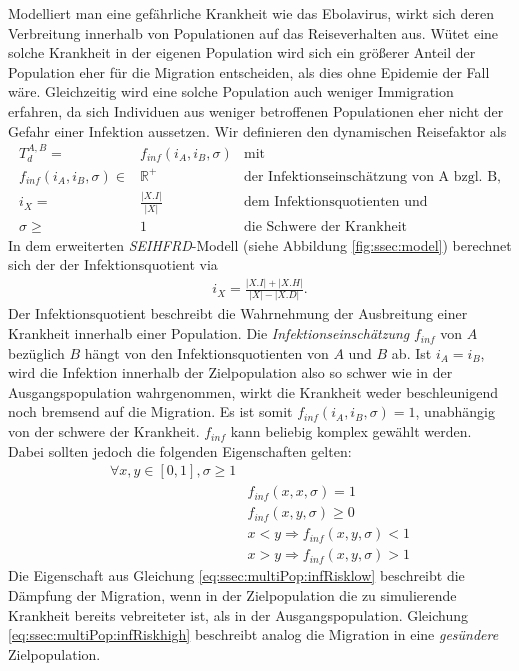 Modelliert man eine gefährliche Krankheit wie das Ebolavirus, wirkt sich deren Verbreitung innerhalb von Populationen auf das Reiseverhalten aus. Wütet eine solche Krankheit in der eigenen Population wird sich ein größerer Anteil der Population eher für die Migration entscheiden, als dies ohne Epidemie der Fall wäre. Gleichzeitig wird eine solche Population auch weniger Immigration erfahren, da sich Individuen aus weniger betroffenen Populationen eher nicht der Gefahr einer Infektion aussetzen. Wir definieren den dynamischen Reisefaktor als
\begin{align}
	T^{A,B}_d =& f_{inf}(i_A,i_B, \sigma)&\text{mit}\\
	f_{inf}(i_A,i_B,\sigma) \in& \mathbb{R}^+&\text{der Infektionseinschätzung von A bzgl. B,}\label{eq:ssec:multiPop:infRisk}\\
	i_X =& \frac{|X.I|}{|X|}&\text{dem Infektionsquotienten und}\\
	\sigma \geq&1 & \text{die Schwere der Krankheit}\label{eq:ssec:multiPop:severity}
\end{align}
In dem erweiterten \emph{SEIHFRD}-Modell (siehe Abbildung \ref{fig:ssec:model}) berechnet sich der der Infektionsquotient via 
\begin{align}
	i_X = \frac{|X.I|+|X.H|}{|X| - |X.D|}.
\end{align}
Der Infektionsquotient beschreibt die Wahrnehmung der Ausbreitung einer Krankheit innerhalb einer Population. Die \emph{Infektionseinschätzung} $f_{inf}$ von $A$ bezüglich $B$ hängt von den Infektionsquotienten von $A$ und $B$ ab. Ist $i_A = i_B$, wird die Infektion innerhalb der Zielpopulation also so schwer wie in der Ausgangspopulation wahrgenommen, wirkt die Krankheit weder beschleunigend noch bremsend auf die Migration. Es ist somit $f_{inf}(i_A,i_B,\sigma)=1$, unabhängig von der schwere der Krankheit. $f_{inf}$ kann beliebig komplex gewählt werden. Dabei sollten jedoch die folgenden Eigenschaften gelten:
\begin{align}
	\forall x, y \in [0,1], \sigma \geq 1 & \nonumber\\
		& f_{inf}(x,x,\sigma) = 1\\
		& f_{inf}(x,y,\sigma) \geq 0\\
		& x < y \Rightarrow f_{inf}(x,y,\sigma) < 1 \label{eq:ssec:multiPop:infRisklow}\\
		& x > y \Rightarrow f_{inf}(x,y,\sigma) > 1 \label{eq:ssec:multiPop:infRiskhigh}
\end{align}
Die Eigenschaft aus Gleichung \ref{eq:ssec:multiPop:infRisklow} beschreibt die Dämpfung der Migration, wenn in der Zielpopulation die zu simulierende Krankheit bereits vebreiteter ist, als in der Ausgangspopulation. Gleichung \ref{eq:ssec:multiPop:infRiskhigh} beschreibt analog die Migration in eine \emph{gesündere} Zielpopulation.


